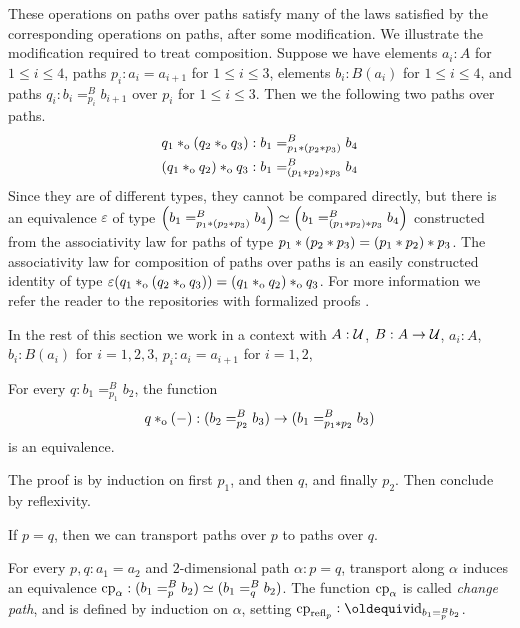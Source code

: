 \documentclass[a4paper,12pt]{amsart}
\begin{document}
These operations on paths over paths satisfy many of the laws satisfied by the corresponding operations on paths, after some modification.  We
illustrate the modification required to treat composition.  Suppose we have elements $a_i : A$ for $1 \le i \le 4$, paths $p_i : a_i = a_{i+1}$
for $1 \le i \le 3$, elements $b_i:B(a_i)$ for $1 \le i \le 4$, and paths $q_i : b_i =^B_{p_i} b_{i+1}$ over $p_i$ for $1 \le i \le 3$.
Then we the following two paths over paths.
\begin{align*}
   q_1 *_{\mathrm{o}} (q_2 *_{\mathrm{o}} q_3) & : b_1 =^B_{p_1* (p_2* p_3)} b_4 \\
  (q_1 *_{\mathrm{o}} q_2) *_{\mathrm{o}} q_3  & : b_1 =^B_{(p_1* p_2) * p_3} b_4
\end{align*}
Since they are of different types, they cannot be compared directly, but there is an
equivalence $\varepsilon$ of type $\left( b_1 =^B_{p_1* (p_2* p_3)} b_4 \right) \simeq \left( b_1 =^B_{(p_1* p_2) * p_3} b_4 \right)$
constructed from the associativity law for paths of type $p_1*(p_2* p_3) = (p_1* p_2)* p_3$.
The associativity law for composition of paths over paths is an easily constructed identity of type $\varepsilon(q_1 *_{\mathrm{o}} (q_2 *_{\mathrm{o}} q_3)) = (q_1 *_{\mathrm{o}} q_2)*_{\mathrm{o}} q_3$.
For more information we refer the reader to the repositories with formalized proofs \cite{circleind-Dan}.

In the rest of this section we work in a context with
$A : \mathcal{U}$, $B : A \to \mathcal{U}$, $a_i:A$, $b_i:B(a_i)$ for $i=1,2,3$,
$p_i : a_i = a_{i+1}$ for $i=1,2$,

\begin{lemma}\label{lem:compo-over}
  For every $q : b_1 =^B_{p_1} b_2$, the
  function
  \[
    q *_{\mathrm{o}} ({-}) : (b_2 =^B_{p_2} b_3) \to (b_1 =^B_{p_1* p_2} b_3)
  \]
  is an equivalence.
\end{lemma}
The proof is by induction on first $p_1$, and then $q$, and finally $p_2$.
Then conclude by reflexivity.

If $p=q$, then we can transport paths over $p$ to paths over $q$.

\begin{definition}\label{def:pathover-change-path}
  For every $p,q:a_1=a_2$ and $2$-dimensional path $\alpha : p = q$,
  transport along $\alpha$
  induces an equivalence $\mathrm{cp}_{\alpha}: (b_1 =^B_p b_2) \simeq (b_1 =^B_q b_2)$.
  The function $\mathrm{cp}_{\alpha}$ is called \emph{change path}, and is defined
  by induction on $\alpha$, setting $\cp{\refl{p}}\defeq \id_{b_1 =^B_p b_2}$.
\end{definition}
\end{document}
